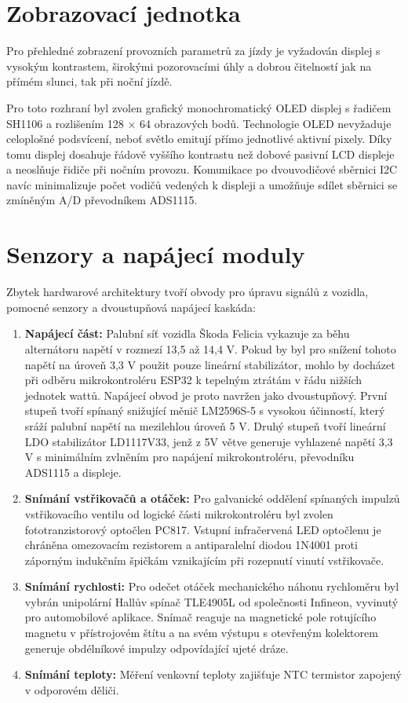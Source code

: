 \section{Zobrazovací jednotka}

Pro přehledné zobrazení provozních parametrů za jízdy je vyžadován displej s vysokým kontrastem, širokými pozorovacími úhly a dobrou čitelností jak na přímém slunci, 
tak při noční jízdě.

Pro toto rozhraní byl zvolen grafický monochromatický OLED displej s řadičem SH1106 a rozlišením 128 × 64 obrazových bodů. 
Technologie OLED nevyžaduje celoplošné podsvícení, neboť světlo emitují přímo jednotlivé aktivní pixely. 
Díky tomu displej dosahuje řádově vyššího kontrastu než dobové pasivní LCD displeje a neoslňuje řidiče při nočním provozu. 
Komunikace po dvouvodičové sběrnici I2C navíc minimalizuje počet vodičů vedených k displeji a umožňuje sdílet sběrnici se zmíněným A/D převodníkem ADS1115.

\section{Senzory a napájecí moduly}

Zbytek hardwarové architektury tvoří obvody pro úpravu signálů z vozidla, pomocné senzory a dvoustupňová napájecí kaskáda:

\begin{enumerate}
    \item \textbf{Napájecí část:} Palubní síť vozidla Škoda Felicia vykazuje za běhu alternátoru napětí v rozmezí 13,5 až 14,4 V. 
Pokud by byl pro snížení tohoto napětí na úroveň 3,3 V použit pouze lineární stabilizátor, mohlo by docházet při odběru mikrokontroléru ESP32 k 
tepelným ztrátám v řádu nižších jednotek wattů. Napájecí obvod je proto navržen jako dvoustupňový. První stupeň tvoří spínaný snižující měnič LM2596S-5 s vysokou účinností, 
který sráží palubní napětí na mezilehlou úroveň 5 V. Druhý stupeň tvoří lineární LDO stabilizátor LD1117V33, 
jenž z 5V větve generuje vyhlazené napětí 3,3 V s minimálním zvlněním pro napájení mikrokontroléru, převodníku ADS1115 a displeje.
    \item \textbf{Snímání vstřikovačů a otáček:} Pro galvanické oddělení spínaných impulzů vstřikovacího ventilu od logické části mikrokontroléru byl zvolen 
    fototranzistorový optočlen PC817. Vstupní infračervená LED optočlenu je chráněna omezovacím rezistorem a antiparalelní diodou 1N4001 proti záporným indukčním 
    špičkám vznikajícím při rozepnutí vinutí vstřikovače.
    \item \textbf{Snímání rychlosti:} Pro odečet otáček mechanického náhonu rychloměru byl vybrán unipolární Hallův spínač TLE4905L od společnosti Infineon, 
    vyvinutý pro automobilové aplikace. Snímač reaguje na magnetické pole rotujícího magnetu v přístrojovém štítu a na svém výstupu s otevřeným kolektorem generuje 
    obdélníkové impulzy odpovídající ujeté dráze.
    \item \textbf{Snímání teploty:} Měření venkovní teploty zajišťuje NTC termistor zapojený v odporovém děliči. 
\end{enumerate}


